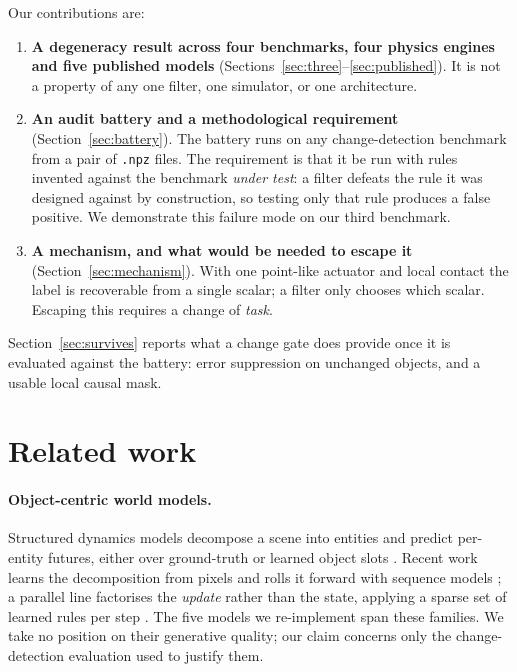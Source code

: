\documentclass{article}
\begin{document}
Our contributions are:

\begin{enumerate}
\item \textbf{A degeneracy result across four benchmarks, four physics engines and five
published models} (Sections~\ref{sec:three}--\ref{sec:published}). It is not a property of any
one filter, one simulator, or one architecture.
\item \textbf{An audit battery and a methodological requirement} (Section~\ref{sec:battery}).
The battery runs on any change-detection benchmark from a pair of \texttt{.npz} files. The
requirement is that it be run with rules invented against the benchmark \emph{under test}: a
filter defeats the rule it was designed against by construction, so testing only that rule
produces a false positive. We demonstrate this failure mode on our third benchmark.
\item \textbf{A mechanism, and what would be needed to escape it} (Section~\ref{sec:mechanism}).
With one point-like actuator and local contact the label is recoverable from a single scalar;
a filter only chooses which scalar. Escaping this requires a change of \emph{task}.
\end{enumerate}

Section~\ref{sec:survives} reports what a change gate does provide once it is evaluated against
the battery: error suppression on unchanged objects, and a usable local causal mask.

\section{Related work}

\paragraph{Object-centric world models.} Structured dynamics models decompose a scene into
entities and predict per-entity futures, either over ground-truth or learned object slots
\citep{battaglia2016interaction,chang2017npe,sanchezgonzalez2020gns,li2019dpinet,veerapaneni2020op3}.
Recent work learns the decomposition from pixels \citep{locatello2020slot,kipf2020cswm} and
rolls it forward with sequence models \citep{wu2023slotformer}; a parallel line factorises the
\emph{update} rather than the state, applying a sparse set of learned rules per step
\citep{goyal2021nps}. The five models we re-implement span these families. We take no position
on their generative quality; our claim concerns only the change-detection evaluation used to
justify them.
\end{document}
